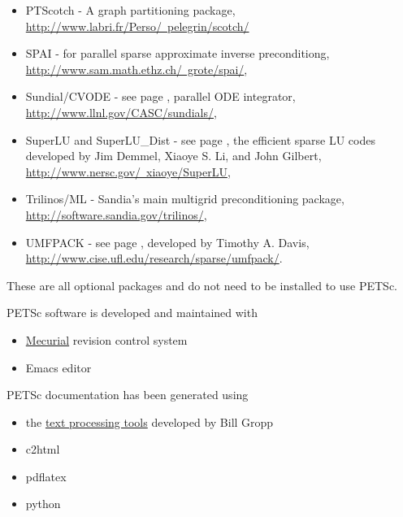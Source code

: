 \begin{itemize}
  \item PTScotch -    A graph partitioning package, \href{http://www.labri.fr/Perso/~pelegrin/scotch/}{http://www.labri.fr/Perso/~pelegrin/scotch/}
  \item SPAI -        for parallel sparse approximate inverse preconditiong, 
                     \href{http://www.sam.math.ethz.ch/~grote/spai/}{http://www.sam.math.ethz.ch/~grote/spai/},
  \item Sundial/CVODE - see page \pageref{sec_sundials}, parallel ODE integrator,
                     \href{http://www.llnl.gov/CASC/sundials/}{http://www.llnl.gov/CASC/sundials/},
  \item SuperLU and SuperLU\_Dist - see page \pageref{sec_externalsol}, 
                    the efficient sparse LU codes developed by Jim Demmel,  Xiaoye S. Li, and John Gilbert, 
                    \href{http://www.nersc.gov/~xiaoye/SuperLU}{http://www.nersc.gov/~xiaoye/SuperLU},
  \item Trilinos/ML - Sandia's main multigrid preconditioning package, \href{http://software.sandia.gov/trilinos/}{http://software.sandia.gov/trilinos/},
  \item UMFPACK - see page \pageref{sec_externalsol}, 
                    developed by Timothy A. Davis, 
                    \href{http://www.cise.ufl.edu/research/sparse/umfpack/}{http://www.cise.ufl.edu/research/sparse/umfpack/}.
\end{itemize}
These are all optional packages and do not need to be installed to use PETSc.

PETSc software is developed and maintained with 
\begin{itemize}
\item \href{http://mercurial.selenic.com/}{Mecurial} revision control system
\item Emacs editor
\end{itemize}

PETSc documentation has been generated using
\begin{itemize}
\item the \href{http://www.cs.uiuc.edu/~wgropp/projects/software/sowing/index.htm}{text processing tools} developed by Bill Gropp
\item c2html
\item pdflatex
\item python
\end{itemize}

